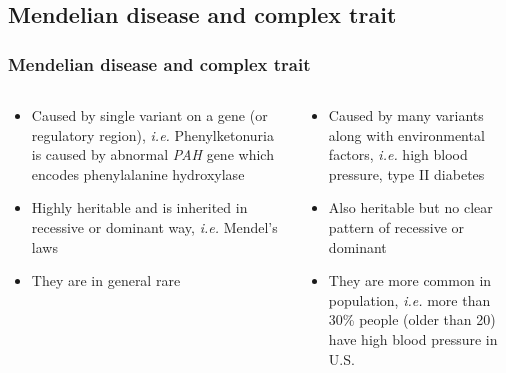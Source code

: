 \documentclass{beamer}
\begin{document}
  \subsection{Mendelian disease and complex trait}
  \begin{frame}
  \frametitle{Mendelian disease and complex trait}
    \begin{columns}
      \begin{column}{.49\textwidth}
        \begin{itemize}
          \item Caused by single variant on a gene (or regulatory region), \textit{i.e.} Phenylketonuria is caused by abnormal \textit{PAH} gene which encodes phenylalanine hydroxylase
          \item Highly heritable and is inherited in recessive or dominant way, \textit{i.e.} Mendel's laws
          \item They are in general rare
        \end{itemize}
      \end{column}
      \begin{column}{.49\textwidth}
        \begin{itemize}
          \item Caused by many variants along with environmental factors, \textit{i.e.} high blood pressure, type II diabetes
          \item Also heritable but no clear pattern of recessive or dominant
          \item They are more common in population, \textit{i.e.} more than 30\% people (older than 20) have high blood pressure in U.S.
        \end{itemize}
      \end{column}
    \end{columns}
  \end{frame}
\end{document}
